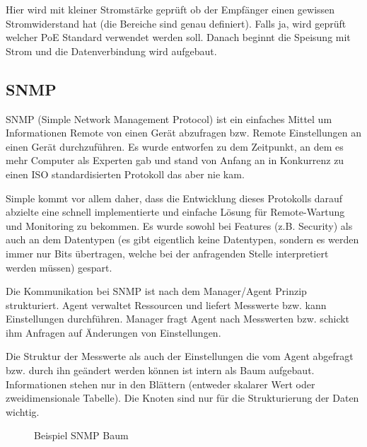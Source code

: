 Hier wird mit kleiner Stromstärke geprüft ob der Empfänger einen gewissen Stromwiderstand hat (die Bereiche sind genau definiert). Falls ja, wird geprüft welcher PoE Standard verwendet werden soll. Danach beginnt die Speisung mit Strom und die Datenverbindung wird aufgebaut.

\subsection{SNMP}
\label{sec:SNMP}
SNMP (Simple Network Management Protocol) ist ein einfaches Mittel um Informationen Remote von einen Gerät abzufragen bzw. Remote Einstellungen an einen Gerät durchzuführen. Es wurde entworfen zu dem Zeitpunkt, an dem es mehr Computer als Experten gab und stand von Anfang an in Konkurrenz zu einen ISO standardisierten Protokoll das aber nie kam.

Simple kommt vor allem daher, dass die Entwicklung dieses Protokolls darauf abzielte eine schnell implementierte und einfache Lösung für Remote-Wartung und Monitoring zu bekommen. Es wurde sowohl bei Features (z.B. Security) als auch an dem Datentypen (es gibt eigentlich keine Datentypen, sondern es werden immer nur Bits übertragen, welche bei der anfragenden Stelle interpretiert werden müssen) gespart.

Die Kommunikation bei SNMP ist nach dem Manager/Agent Prinzip strukturiert. Agent verwaltet Ressourcen und liefert Messwerte bzw. kann Einstellungen durchführen. Manager fragt Agent nach Messwerten bzw. schickt ihm Anfragen auf Änderungen von Einstellungen.

Die Struktur der Messwerte als auch der Einstellungen die vom Agent abgefragt bzw. durch ihn geändert werden können ist intern als Baum aufgebaut. Informationen stehen nur in den Blättern (entweder skalarer Wert oder zweidimensionale Tabelle). Die Knoten sind nur für die Strukturierung der Daten wichtig.

\begin{figure}[h]
  \begin{center}
    \caption{Beispiel SNMP Baum}
    \label{fig:snmptree}
  \end{center}
\end{figure}

